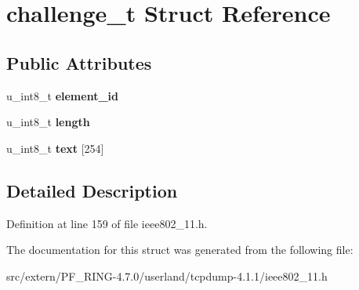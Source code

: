 \hypertarget{structchallenge__t}{
\section{challenge\_\-t Struct Reference}
\label{structchallenge__t}
}
\subsection*{Public Attributes}
\begin{DoxyCompactItemize}
\item 
\hypertarget{structchallenge__t_add29e3cc42e1a8017569c1f16e4f7390}{
u\_\-int8\_\-t {\bfseries element\_\-id}}
\label{structchallenge__t_add29e3cc42e1a8017569c1f16e4f7390}

\item 
\hypertarget{structchallenge__t_afc3e822feb789e2a2873e6b0a11be43b}{
u\_\-int8\_\-t {\bfseries length}}
\label{structchallenge__t_afc3e822feb789e2a2873e6b0a11be43b}

\item 
\hypertarget{structchallenge__t_abd8a4d2685502f0392268e5fe3ccd633}{
u\_\-int8\_\-t {\bfseries text} \mbox{[}254\mbox{]}}
\label{structchallenge__t_abd8a4d2685502f0392268e5fe3ccd633}

\end{DoxyCompactItemize}


\subsection{Detailed Description}


Definition at line 159 of file ieee802\_\-11.h.



The documentation for this struct was generated from the following file:\begin{DoxyCompactItemize}
\item 
src/extern/PF\_\-RING-\/4.7.0/userland/tcpdump-\/4.1.1/ieee802\_\-11.h\end{DoxyCompactItemize}
